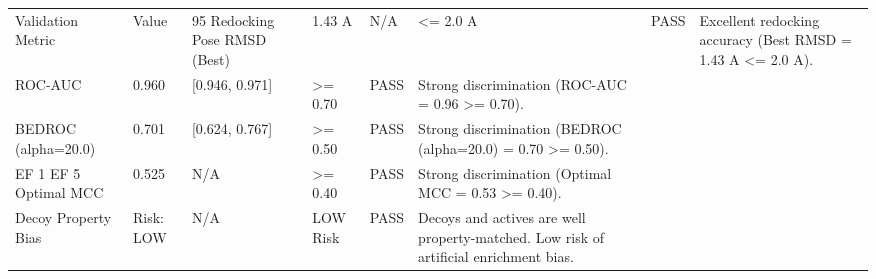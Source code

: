 \begin{tabular}{llllll}
\toprule
Validation Metric & Value & 95%
\midrule
Redocking Pose RMSD (Best) & 1.43 A & N/A & <= 2.0 A & PASS & Excellent redocking accuracy (Best RMSD = 1.43 A <= 2.0 A). \\
ROC-AUC & 0.960 & [0.946, 0.971] & >= 0.70 & PASS & Strong discrimination (ROC-AUC = 0.96 >= 0.70). \\
BEDROC (alpha=20.0) & 0.701 & [0.624, 0.767] & >= 0.50 & PASS & Strong discrimination (BEDROC (alpha=20.0) = 0.70 >= 0.50). \\
EF 1%
EF 5%
Optimal MCC & 0.525 & N/A & >= 0.40 & PASS & Strong discrimination (Optimal MCC = 0.53 >= 0.40). \\
Decoy Property Bias & Risk: LOW & N/A & LOW Risk & PASS & Decoys and actives are well property-matched. Low risk of artificial enrichment bias. \\
\bottomrule
\end{tabular}
